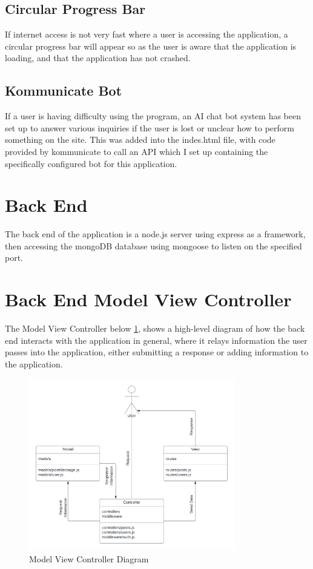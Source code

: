 \subsection{Circular Progress Bar}
If internet access is not very fast where a user is accessing the application, a circular progress bar will appear so as the user is aware that the application is loading, and that the application has not crashed.

\subsection{Kommunicate Bot}
If a user is having difficulty using the program, an AI chat bot system has been set up to answer various inquiries if the user is lost or unclear how to perform something on the site.
This was added into the indes.html file, with code provided by kommunicate to call an API which I set up containing the specifically configured bot for this application.

\section{Back End}
The back end of the application is a node.js server using express as a framework, then accessing the mongoDB database using mongoose to listen on the specified port.

\section{Back End Model View Controller}
The Model View Controller below \ref{image:MVC}, shows a high-level diagram of how the back end interacts with the application in general, where it relays information the user passes into the application, either submitting a response or adding information to the application.
\begin{figure}[h!]
    \centering
    \includegraphics[width=0.8\textwidth]{images/MVC Diagram.png}
    \caption{Model View Controller Diagram}
    \label{image:MVC}
\end{figure}

